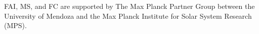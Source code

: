 \documentclass[baaa]{baaa}
\begin{document}
\begin{acknowledgement}
{FAI, MS, and FC are supported by The Max Planck Partner Group between the University of Mendoza and the Max Planck Institute for Solar System Research (MPS)}.
\end{acknowledgement}






\end{document}
